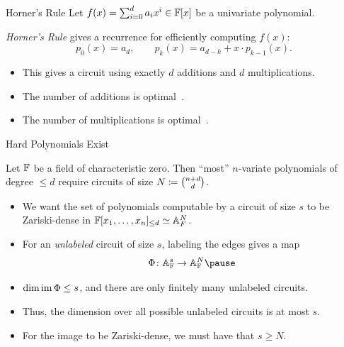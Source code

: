 \documentclass[aspectratio=169]{beamer}
\begin{document}
\begin{frame}{Horner's Rule}
  Let $f(x) = \sum_{i = 0}^d a_i x^i \in \mathbb{F}[x]$ be a univariate polynomial.

  \pause
  \vspace{10pt}

  \begin{ex}\label{ex:horner}
    \emph{Horner's Rule} gives a recurrence for efficiently computing $f(x)$:
    \[
      p_{0}(x) = a_{d}, \qquad p_{k}(x) = a_{d - k} + x \cdot p_{k - 1}(x).
    \]
  \end{ex}

  \pause

  \begin{itemize}
  \item This gives a circuit using exactly $d$ additions and $d$ multiplications. \pause
  \item The number of additions is optimal~\cite{Ost54}.
  \item The number of multiplications is optimal~\cite{Pan66}.
  \end{itemize}
\end{frame}

\begin{frame}{Hard Polynomials Exist}
  \begin{prop}\label{prop:most_hard}
    Let $\mathbb{F}$ be a field of characteristic zero.
    Then ``most'' $n$-variate polynomials of degree $\leq d$ require circuits of size $N \coloneqq \binom{n + d}{d}$.
  \end{prop}

  \pause

  \begin{sketch}
    \begin{itemize}
    \item We want the set of polynomials computable by a circuit of size $s$ to be Zariski-dense in $\mathbb{F}[x_1, \ldots, x_n]_{\leq d} \simeq \mathbb{A}_F^N$.\pause
    \item For an \emph{unlabeled} circuit of size $s$\pause, labeling the edges gives a map
          \[
            \Phi\colon \A_\F^s \to \A_\F^N \pause
          \]
          \vspace{-10pt}
    \item $\dim \operatorname{im} \Phi \leq s$, and there are only finitely many unlabeled circuits.\ \pause
    \item Thus, the dimension over all possible unlabeled circuits is at most $s$.\pause
    \item For the image to be Zariski-dense, we must have that $s \geq N$.
    \end{itemize}
  \end{sketch}
\end{frame}
\end{document}
